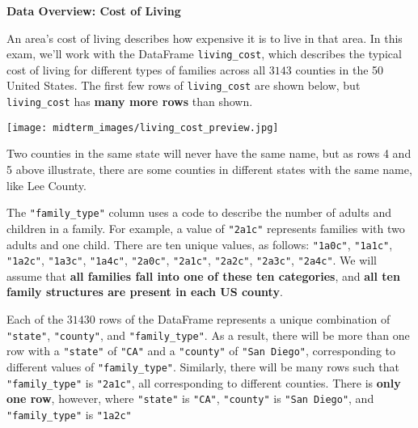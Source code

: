 \documentclass[twoside,12pt]{article}
\begin{document}
\thispagestyle{empty}

\begin{center}
    \noindent \textbf{\large{Data Overview: Cost of Living}} 
\end{center}


\noindent An area's cost of living describes how expensive it is to live in that area. In this exam, we'll work with the DataFrame \texttt{living\_cost}, which describes the typical cost of living for different types of families across all $3143$ counties in the 50 United States. The first few rows of \texttt{living\_cost} are shown below, but \texttt{living\_cost} has \textbf{many more rows} than shown.

\begin{center}
\texttt{[image: midterm\_images/living\_cost\_preview.jpg]}
\end{center}

\noindent Two counties in the same state will never have the same name, but as rows 4 and 5 above illustrate, there are some counties in different states with the same name, like Lee County.

\vspace{0.1in}

\noindent The \texttt{"family\_type"} column uses a code to describe the number of adults and children in a family. For example, a value of \texttt{"2a1c"} represents families with two adults and one child. There are ten unique values, as follows: \texttt{"1a0c"}, \texttt{"1a1c"}, \texttt{"1a2c"}, \texttt{"1a3c"}, \texttt{"1a4c"}, \texttt{"2a0c"}, \texttt{"2a1c"}, \texttt{"2a2c"}, \texttt{"2a3c"}, \texttt{"2a4c"}. We will assume that \textbf{all families fall into one of these ten categories}, and \textbf{all ten family structures are present in each US county}.

\vspace{.1in}

\noindent Each of the $31430$ rows of the DataFrame represents a unique combination of \texttt{"state"}, \texttt{"county"}, and \texttt{"family\_type"}. As a result, there will be more than one row with a \texttt{"state"} of \texttt{"CA"} and a \texttt{"county"} of  \texttt{"San Diego"}, corresponding to different values of \texttt{"family\_type"}. Similarly, there will be many rows such that \texttt{"family\_type"} is \texttt{"2a1c"}, all corresponding to different counties.  There is \textbf{only one row}, however, where \texttt{"state"} is \texttt{"CA"},  \texttt{"county"} is  \texttt{"San Diego"}, and  \texttt{"family\_type"} is \texttt{"1a2c"}
\end{document}
